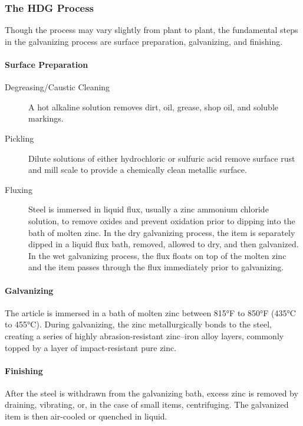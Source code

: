\subsubsection{The HDG Process}

Though the process may vary slightly from plant to plant, the fundamental steps in the galvanizing process are
surface preparation, galvanizing, and finishing.

\paragraph*{Surface Preparation}

\begin{description}
  \item[Degreasing/Caustic Cleaning] A hot alkaline solution removes dirt, oil, grease, shop oil, and soluble markings.
  \item[Pickling] Dilute solutions of either hydrochloric or sulfuric acid remove surface rust and mill scale to provide a
  chemically clean metallic surface.
  \item[Fluxing] Steel is immersed in liquid flux, usually a zinc ammonium chloride solution, to remove oxides and
  prevent oxidation prior to dipping into the bath of molten zinc. In the dry galvanizing process, the item is separately
  dipped in a liquid flux bath, removed, allowed to dry, and then galvanized. In the wet galvanizing process, the flux
  floats on top of the molten zinc and the item passes through the flux immediately prior to galvanizing.
\end{description}

\paragraph*{Galvanizing}
The article is immersed in a bath of molten zinc between 815°F to 850°F (435°C to 455°C). During galvanizing,
the zinc metallurgically bonds to the steel, creating a series of highly abrasion-resistant zinc–iron alloy layers,
commonly topped by a layer of impact-resistant pure zinc.

\paragraph*{Finishing}
After the steel is withdrawn from the galvanizing bath, excess zinc is removed by draining, vibrating, or, in the
case of small items, centrifuging. The galvanized item is then air-cooled or quenched in liquid.

